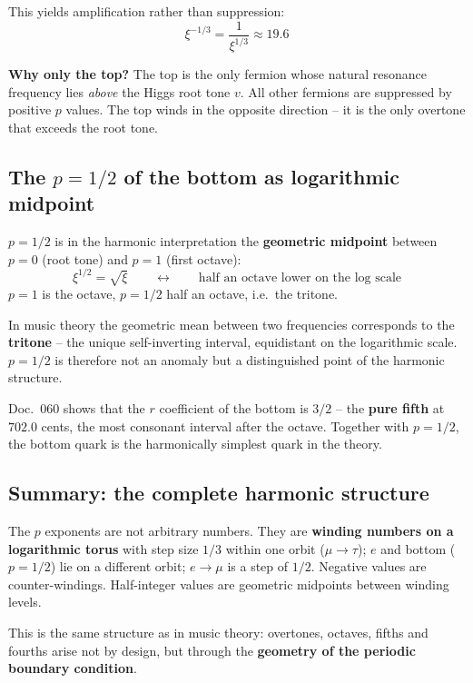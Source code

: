 This yields amplification rather than suppression:
\begin{equation}
    \xi^{-1/3} = \frac{1}{\xi^{1/3}} \approx 19.6
\end{equation}

\textbf{Why only the top?} The top is the only fermion whose natural
resonance frequency lies \emph{above} the Higgs root tone $v$. All
other fermions are suppressed by positive $p$ values. The top winds
in the opposite direction -- it is the only overtone that exceeds
the root tone.

\subsection{The $p = 1/2$ of the bottom as logarithmic midpoint}

$p = 1/2$ is in the harmonic interpretation the \textbf{geometric
midpoint} between $p = 0$ (root tone) and $p = 1$ (first octave):
\begin{equation}
    \xi^{1/2} = \sqrt{\xi} \qquad \longleftrightarrow \qquad
    \text{half an octave lower on the log scale}
\end{equation}
$p = 1$ is the octave, $p = 1/2$ half an octave, i.e.\ the tritone.

In music theory the geometric mean between two frequencies corresponds
to the \textbf{tritone} -- the unique self-inverting interval, equidistant
on the logarithmic scale. $p = 1/2$ is therefore not an anomaly but
a distinguished point of the harmonic structure.

Doc.~060 shows that the $r$ coefficient of the bottom is $3/2$ --
the \textbf{pure fifth} at $702.0$ cents, the most consonant interval
after the octave. Together with $p = 1/2$, the bottom quark is the
harmonically simplest quark in the theory.

\subsection{Summary: the complete harmonic structure}

The $p$ exponents are not arbitrary numbers. They are
\textbf{winding numbers on a logarithmic torus} with step size $1/3$ within one
orbit ($\mu\to\tau$); $e$ and bottom ($p = 1/2$) lie on a different orbit; $e\to\mu$ is a step of $1/2$.
Negative values are counter-windings. Half-integer values are geometric
midpoints between winding levels.

This is the same structure as in music theory: overtones, octaves,
fifths and fourths arise not by design, but through the
\textbf{geometry of the periodic boundary condition}.


